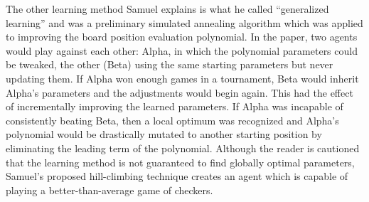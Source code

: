 The other learning method Samuel explains is what he called
``generalized learning''
and was a preliminary simulated annealing algorithm
which was applied to improving the board position evaluation polynomial.
%
In the paper,
two agents would play against each other:
Alpha, in which the polynomial parameters could be tweaked,
the other (Beta) using the same starting parameters but never updating them.
%
If Alpha won enough games in a tournament,
Beta would inherit Alpha's parameters and the adjustments would begin again.
%
This had the effect of incrementally improving the learned parameters.
%
If Alpha was incapable of consistently beating Beta,
then a local optimum was recognized and Alpha's polynomial would be drastically
mutated to another starting position
by eliminating the leading term of the polynomial.
%
Although the reader is cautioned that the learning method is not guaranteed to
find globally optimal parameters,
Samuel's proposed hill-climbing technique creates an agent which is capable
of playing a better-than-average game of checkers.

